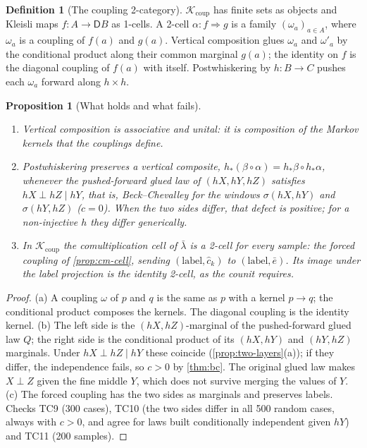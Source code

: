\documentclass[11pt]{article}
\newtheorem{proposition}[theorem]{Proposition}
\theoremstyle{definition}
\newtheorem{definition}[theorem]{Definition}
\newcommand{\D}{\mathsf D}
\newcommand{\lb}{\bar\lambda}
\begin{document}
\begin{definition}[The coupling 2-category]
$\mathcal K_{\mathrm{coup}}$ has finite sets as objects and Kleisli maps $f\colon A\to\D B$ as 1-cells. A 2-cell $\alpha\colon f\Rightarrow g$ is a
family $(\omega_a)_{a\in A}$, where $\omega_a$ is a coupling of $f(a)$ and $g(a)$. Vertical composition glues $\omega_a$ and $\omega'_a$ by the
conditional product along their common marginal $g(a)$; the identity on $f$ is the diagonal coupling of $f(a)$ with itself.
Postwhiskering by $h\colon B\to C$ pushes each $\omega_a$ forward along $h\times h$.
\end{definition}

\begin{proposition}[What holds and what fails]\label{prop:coupling-2cat}
\begin{enumerate}[label=(\alph*)]
\item Vertical composition is associative and unital: it is composition of the Markov kernels that the couplings define.
\item Postwhiskering preserves a vertical composite, $h_*(\beta\circ\alpha)=h_*\beta\circ h_*\alpha$, whenever the pushed-forward glued
  law of $(hX,hY,hZ)$ satisfies $hX\perp hZ\mid hY$, that is, Beck--Chevalley for the windows $\sigma(hX,hY)$ and $\sigma(hY,hZ)$
  ($c=0$). When the two sides differ, that defect is positive; for a non-injective $h$ they differ generically.
\item In $\mathcal K_{\mathrm{coup}}$ the comultiplication cell of $\lb$ is a 2-cell for every sample: the forced coupling of
  \cref{prop:cm-cell}, sending $(\text{label},\hat c_k)$ to $(\text{label},\bar e)$. Its image under the label projection is the identity
  2-cell, as the counit requires.
\end{enumerate}
\end{proposition}
\begin{proof}
(a) A coupling $\omega$ of $p$ and $q$ is the same as $p$ with a kernel $p\to q$; the conditional product composes the kernels. The
diagonal coupling is the identity kernel.
(b) The left side is the $(hX,hZ)$-marginal of the pushed-forward glued law $Q$; the right side is the conditional product of its
$(hX,hY)$ and $(hY,hZ)$ marginals. Under $hX\perp hZ\mid hY$ these coincide (\cref{prop:two-layers}(a)); if they differ, the
independence fails, so $c>0$ by \cref{thm:bc}. The original glued law makes $X\perp Z$ given the fine middle $Y$, which does not survive
merging the values of $Y$.
(c) The forced coupling has the two sides as marginals and preserves labels.
Checks TC9 (300 cases), TC10 (the two sides differ in all 500 random cases, always with $c>0$, and agree for laws built conditionally
independent given $hY$) and TC11 (200 samples).
\end{proof}
\end{document}
